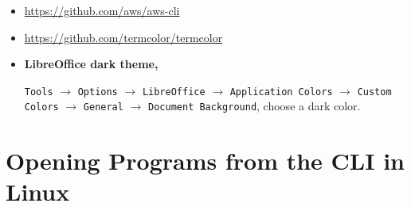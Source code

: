 \documentclass[12pt, a4paper]{scrbook}
\numberwithin{equation}{section}
\theoremstyle{definition}
\theoremstyle{definition}
\begin{document}
\begin{itemize}
\begin{itemize}
		\end{itemize}
		
		\item \url{https://github.com/aws/aws-cli}
		
		\item \url{https://github.com/termcolor/termcolor}
		
		\item \textbf{LibreOffice dark theme,}
		
		\texttt{Tools} $\rightarrow$ \texttt{Options} $\rightarrow$ \texttt{LibreOffice} $\rightarrow$ \texttt{Application Colors} $\rightarrow$ \texttt{Custom Colors} $\rightarrow$ \texttt{General} $\rightarrow$ \texttt{Document Background}, choose a dark color.
		
	\end{itemize}

	\chapter{Opening Programs from the CLI in Linux}
		
\end{document}
